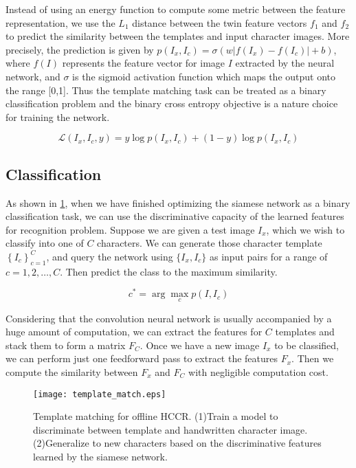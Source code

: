 \documentclass[conference]{IEEEtran}
\begin{document}
Instead of using an energy function to compute some metric between the feature representation, we use the $L_1$ distance between the twin feature vectors $f_1$ and $f_2$ to predict the similarity between the templates and input character images. More precisely, the prediction is given by $p(I_x, I_c)=\sigma(w|f(I_x)-f(I_c)|+b)$, where $f(I)$ represents the feature vector for image $I$ extracted by the neural network, and $\sigma $ is the sigmoid activation function which maps the output onto the range [0,1]. Thus the template matching task can be treated as a binary classification problem and the binary cross entropy objective is a nature choice for training the network.

\begin{equation}
	\mathcal{L}(I_x,I_c,y)=y\log{p(I_x, I_c)}+(1-y)\log{p(I_x, I_c)}
\end{equation}




\subsection{Classification}
As shown in \figurename \ref{template_match}, when we have finished optimizing the siamese network as a binary classification task, we can use the discriminative capacity of the learned features for recognition problem. Suppose we are given a test image $I_x$, which we wish to classify into one of $C$ characters. We can generate those character template $\left\{I_c\right\}_{c=1}^{C}$, and query the network using $\{I_x, I_c\}$ as input pairs for a range of $c=1,2,\ldots,C$. Then predict the class to the maximum similarity.

\begin{equation}
	c^*=\arg\max_c{p(I, I_c)}
\end{equation}

Considering that the convolution neural network is usually accompanied by a huge amount of computation, we can extract the features for $C$ templates and stack them to form a matrix $F_C$. Once we have a new image $I_x$ to be classified, we can perform just one feedforward pass to extract the features $F_x$. Then we compute the similarity between $F_x$ and $F_C$ with negligible computation cost.   

\begin{figure}[htb]
	\centering
	\texttt{[image: template\_match.eps]}
	\caption{Template matching for offline HCCR. (1)Train a model to discriminate between template and handwritten character image. (2)Generalize to new characters based on the discriminative features learned by the siamese network.}
	\label{template_match}
\end{figure}
\end{document}
